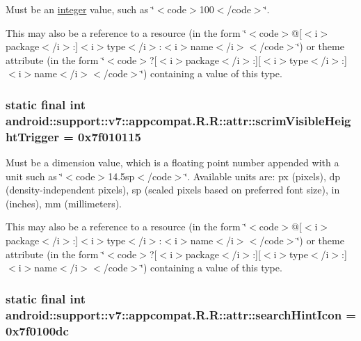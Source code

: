 Must be an \hyperlink{classandroid_1_1support_1_1v7_1_1appcompat_1_1_r_1_1integer}{integer} value, such as \char`\"{}$<$code$>$100$<$/code$>$\char`\"{}. 

This may also be a reference to a resource (in the form \char`\"{}$<$code$>$@\mbox{[}$<$i$>$package$<$/i$>$:\mbox{]}$<$i$>$type$<$/i$>$:$<$i$>$name$<$/i$>$$<$/code$>$\char`\"{}) or theme attribute (in the form \char`\"{}$<$code$>$?\mbox{[}$<$i$>$package$<$/i$>$:\mbox{]}\mbox{[}$<$i$>$type$<$/i$>$:\mbox{]}$<$i$>$name$<$/i$>$$<$/code$>$\char`\"{}) containing a value of this type. \hypertarget{classandroid_1_1support_1_1v7_1_1appcompat_1_1_r_1_1attr_3eb9880d05f7b4c0d35f0637c3293fc8}{
\subsubsection[{scrimVisibleHeightTrigger}]{\setlength{\rightskip}{0pt plus 5cm}static final int android::support::v7::appcompat.R.R::attr::scrimVisibleHeightTrigger = 0x7f010115}}
\label{classandroid_1_1support_1_1v7_1_1appcompat_1_1_r_1_1attr_3eb9880d05f7b4c0d35f0637c3293fc8}


Must be a dimension value, which is a floating point number appended with a unit such as \char`\"{}$<$code$>$14.5sp$<$/code$>$\char`\"{}. Available units are: px (pixels), dp (density-independent pixels), sp (scaled pixels based on preferred font size), in (inches), mm (millimeters). 

This may also be a reference to a resource (in the form \char`\"{}$<$code$>$@\mbox{[}$<$i$>$package$<$/i$>$:\mbox{]}$<$i$>$type$<$/i$>$:$<$i$>$name$<$/i$>$$<$/code$>$\char`\"{}) or theme attribute (in the form \char`\"{}$<$code$>$?\mbox{[}$<$i$>$package$<$/i$>$:\mbox{]}\mbox{[}$<$i$>$type$<$/i$>$:\mbox{]}$<$i$>$name$<$/i$>$$<$/code$>$\char`\"{}) containing a value of this type. \hypertarget{classandroid_1_1support_1_1v7_1_1appcompat_1_1_r_1_1attr_c3afbcca419c2a43e3782be584c2515d}{
\subsubsection[{searchHintIcon}]{\setlength{\rightskip}{0pt plus 5cm}static final int android::support::v7::appcompat.R.R::attr::searchHintIcon = 0x7f0100dc}}
\label{classandroid_1_1support_1_1v7_1_1appcompat_1_1_r_1_1attr_c3afbcca419c2a43e3782be584c2515d}


